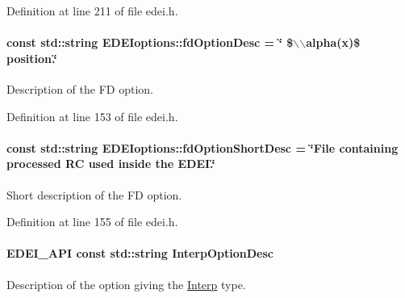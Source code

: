 Definition at line 211 of file edei.h.

\hypertarget{group__edeiedei_ga1d5c3f1289ef962d44d52f344e932369}{
\paragraph[{fdOptionDesc}]{\setlength{\rightskip}{0pt plus 5cm}const std::string {\bf EDEIoptions::fdOptionDesc} = \char`\"{} \$$\backslash$$\backslash$alpha(x)\$ position.\char`\"{}}\hfill}
\label{group__edeiedei_ga1d5c3f1289ef962d44d52f344e932369}


Description of the FD option. 



Definition at line 153 of file edei.h.

\hypertarget{group__edeiedei_ga270b21583b3f075758bd30fd3df8f7fa}{
\paragraph[{fdOptionShortDesc}]{\setlength{\rightskip}{0pt plus 5cm}const std::string {\bf EDEIoptions::fdOptionShortDesc} = \char`\"{}File containing processed RC used inside the EDEI.\char`\"{}}\hfill}
\label{group__edeiedei_ga270b21583b3f075758bd30fd3df8f7fa}


Short description of the FD option. 



Definition at line 155 of file edei.h.

\hypertarget{group__edeiedei_ga8937835900a2532f1c8b381e81288b91}{
\paragraph[{InterpOptionDesc}]{\setlength{\rightskip}{0pt plus 5cm}EDEI\_\-API const std::string {\bf InterpOptionDesc}}\hfill}
\label{group__edeiedei_ga8937835900a2532f1c8b381e81288b91}


Description of the option giving the \hyperlink{classInterp}{Interp} type. 

